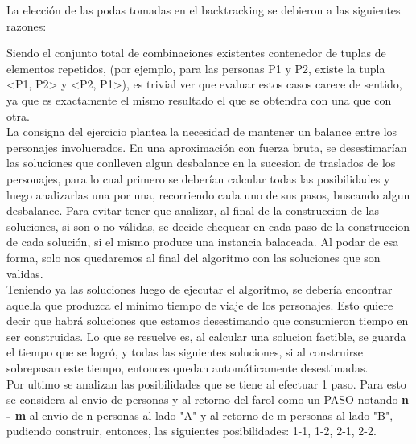 La elección de las podas tomadas en el backtracking se debieron a las siguientes razones:

Siendo el conjunto total de combinaciones existentes contenedor de tuplas de elementos repetidos, (por ejemplo, para las personas P1 y P2, existe la tupla <P1, P2> y <P2, P1>), es trivial ver que evaluar estos casos carece de sentido, ya que es exactamente el mismo resultado el que se obtendra con una que con otra.\\

La consigna del ejercicio plantea la necesidad de mantener un balance entre los personajes involucrados. En una aproximación con fuerza bruta, se desestimarían las soluciones que conlleven algun desbalance en la sucesion de traslados de los personajes, para lo cual primero se deberían calcular todas las posibilidades y luego analizarlas una por una, recorriendo cada uno de sus pasos, buscando algun desbalance. Para evitar tener que analizar, al final de la construccion de las soluciones, si son o no válidas, se decide chequear en cada paso de la construccion de cada solución, si el mismo produce una instancia balaceada. Al podar de esa forma, solo nos quedaremos al final del algoritmo con las soluciones que son validas.\\

Teniendo ya las soluciones luego de ejecutar el algoritmo, se debería encontrar aquella que produzca el mínimo tiempo de viaje de los personajes. Esto quiere decir que habrá soluciones que estamos desestimando que consumieron tiempo en ser construidas. Lo que se resuelve es, al calcular una solucion factible, se guarda el tiempo que se logró, y todas las siguientes soluciones, si al construirse sobrepasan este tiempo, entonces quedan automáticamente desestimadas.\\

Por ultimo se analizan las posibilidades que se tiene al efectuar 1 paso. Para esto se considera al envio de personas y al retorno del farol como un PASO notando \textbf{n - m} al envio de n personas al lado "A" y al retorno de m personas al lado "B", pudiendo construir, entonces, las siguientes posibilidades: {1-1, 1-2, 2-1, 2-2}.





 

 